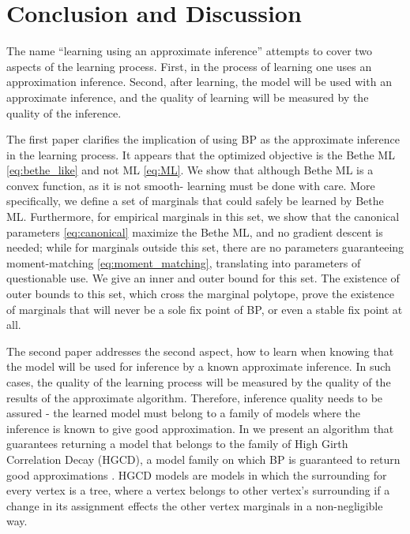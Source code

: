 \chapter{Conclusion and Discussion } %
\label{con} %
The name ``learning using an approximate inference''  attempts to cover two aspects of the learning process.
First, in the process of learning one uses an approximation inference.
Second, after learning, the model will be used with an approximate inference, and the quality of learning will be measured by the quality of the inference.

The first paper  clarifies the implication of using BP as the approximate inference in the learning process.
It appears that the optimized objective is the Bethe ML \eqref{eq:bethe_like} and not ML \eqref{eq:ML}.
We show that although Bethe ML is a convex function, as it is not smooth- learning must be done with care.
More specifically, we define a set of marginals that could safely be learned by Bethe ML.
Furthermore, for empirical marginals in this set, we show that the canonical parameters \eqref{eq:canonical} maximize the Bethe ML, and no gradient descent is needed;
while for marginals outside this set, there are no parameters guaranteeing moment-matching \eqref{eq:moment_matching}, translating into parameters of questionable use.
We give an inner and outer bound for this set.
The existence of outer bounds to this set, which cross the marginal polytope, prove the existence of marginals that will never be a sole fix point of BP, or even a stable fix point at all.

The second paper addresses the second aspect, how to learn when knowing that the model will be used for inference by a known approximate inference.
In such cases, the quality of the learning process will be measured by the quality of the results of the approximate algorithm. 
Therefore, inference quality needs to be assured - the learned  model must belong to a family of models where the inference is known to give good approximation.
In  we present an algorithm that guarantees returning a model that belongs to the family of High Girth Correlation Decay (HGCD), a model family on which BP is guaranteed to return good approximations .
HGCD models are models in which the surrounding for every vertex is a tree, where a vertex belongs to other vertex's surrounding if a change in its assignment effects the other vertex marginals in a non-negligible way.

